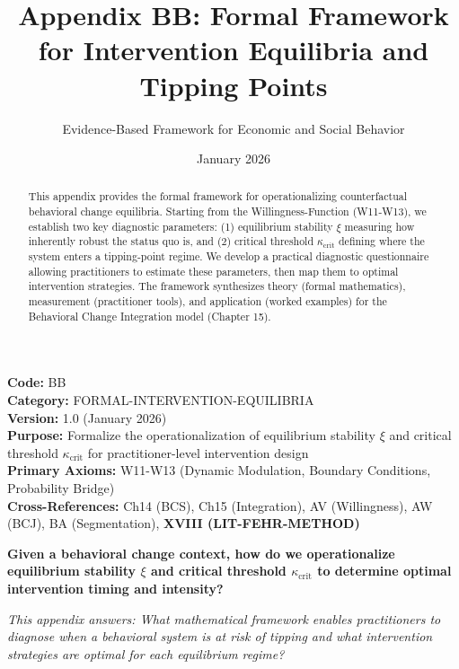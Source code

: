 \documentclass[11pt, a4paper]{article}
\title{Appendix BB: Formal Framework for Intervention Equilibria and Tipping Points}
\author{Evidence-Based Framework for Economic and Social Behavior}
\date{January 2026}
\begin{document}
\maketitle


\begin{tcolorbox}[colback=gray!10!white, colframe=gray!75!black, title=Appendix Metadata]
\textbf{Code:} BB \\
\textbf{Category:} FORMAL-INTERVENTION-EQUILIBRIA \\
\textbf{Version:} 1.0 (January 2026) \\
\textbf{Purpose:} Formalize the operationalization of equilibrium stability $\xi$ and critical threshold $\kappa_{\text{crit}}$
for practitioner-level intervention design \\
\textbf{Primary Axioms:} W11-W13 (Dynamic Modulation, Boundary Conditions, Probability Bridge) \\
\textbf{Cross-References:} Ch14 (BCS), Ch15 (Integration), AV (Willingness),
AW (BCJ), BA (Segmentation), \textbf{XVIII (LIT-FEHR-METHOD)} \\
\end{tcolorbox}

\begin{abstract}
This appendix provides the formal framework for operationalizing counterfactual behavioral change equilibria.
Starting from the Willingness-Function (W11-W13), we establish two key diagnostic parameters:
(1) equilibrium stability $\xi$ measuring how inherently robust the status quo is, and
(2) critical threshold $\kappa_{\text{crit}}$ defining where the system enters a tipping-point regime.
We develop a practical diagnostic questionnaire allowing practitioners to estimate these parameters,
then map them to optimal intervention strategies. The framework synthesizes theory (formal mathematics),
measurement (practitioner tools), and application (worked examples) for the Behavioral Change Integration model (Chapter 15).
\end{abstract}


\begin{tcolorbox}[colback=blue!5!white, colframe=blue!75!black,
    title=\textbf{Fundamental Question}]
\textbf{Given a behavioral change context, how do we operationalize equilibrium stability $\xi$
and critical threshold $\kappa_{\text{crit}}$ to determine optimal intervention timing and intensity?}

\medskip
\textit{This appendix answers: What mathematical framework enables practitioners to diagnose
when a behavioral system is at risk of tipping and what intervention strategies are optimal
for each equilibrium regime?}
\end{tcolorbox}
\end{document}
